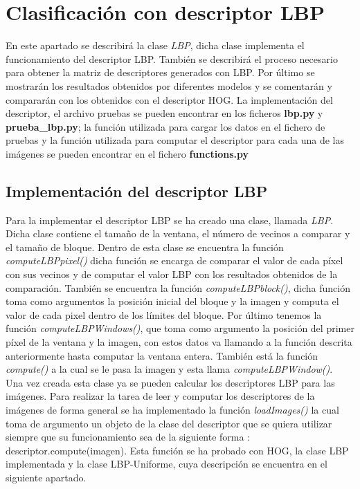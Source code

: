 \chapter{Clasificación con descriptor LBP}
En este apartado se describirá la clase \textit{LBP}, dicha clase implementa el funcionamiento del descriptor LBP. También se describirá el proceso necesario para obtener la matriz de descriptores generados con LBP. Por último se mostrarán los resultados obtenidos por diferentes modelos y se comentarán y compararán con los obtenidos con el descriptor HOG. La implementación del descriptor, el archivo pruebas se pueden encontrar en los ficheros \textbf{lbp.py} y \textbf{prueba\_lbp.py}; la función utilizada para cargar los datos en el fichero de pruebas y la función utilizada para computar el descriptor para cada una de las imágenes se pueden encontrar en el fichero \textbf{functions.py}

\section{Implementación del descriptor LBP}
Para la implementar el descriptor LBP se ha creado una clase, llamada \textit{LBP}. Dicha clase contiene el tamaño de la ventana, el número de vecinos a comparar y el tamaño de bloque. Dentro de esta clase se encuentra la función \textit{computeLBPpixel()} dicha función se encarga de comparar el valor de cada píxel con sus vecinos y de computar el valor LBP con los resultados obtenidos de la comparación. También se encuentra la función \textit{computeLBPblock()}, dicha función toma como argumentos la posición inicial del bloque y la imagen y computa el valor de cada pixel dentro de los límites del bloque. Por último tenemos la función \textit{computeLBPWindows()}, que toma como argumento la posición del primer píxel de la ventana y la imagen, con estos datos va llamando a la función descrita anteriormente hasta computar la ventana entera. También está la función \textit{compute()} a la cual se le pasa la imagen y esta llama \textit{computeLBPWindow()}. \\

Una vez creada esta clase ya se pueden calcular los descriptores LBP para las imágenes. Para realizar la tarea de leer y computar los descriptores de la imágenes de forma general se ha implementado la función \textit{loadImages()} la cual toma de argumento un objeto de la clase del descriptor que se quiera utilizar siempre que su funcionamiento sea de la siguiente forma : descriptor.compute(imagen). Esta función se ha probado con HOG, la clase LBP implementada y la clase LBP-Uniforme, cuya descripción se encuentra en el siguiente apartado.

